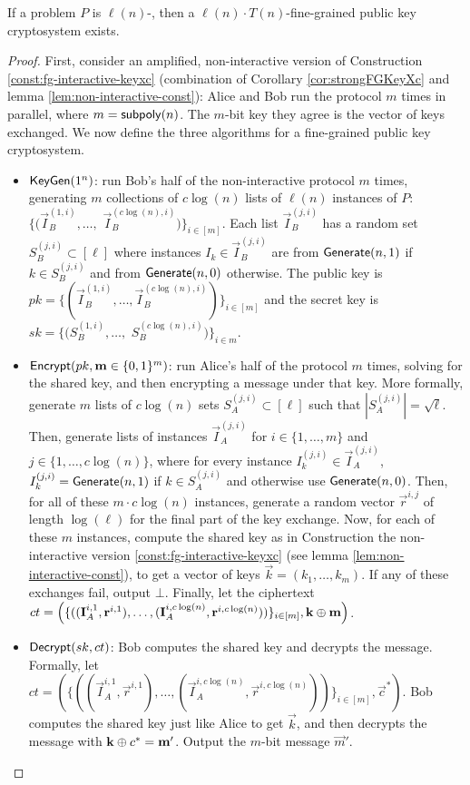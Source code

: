 \begin{theorem}\label{thm:fg-pkc-exists}
	 If a problem $P$ is $\ell(n)$-\keyER, then a $\ell(n) \cdot T(n)$-fine-grained public key cryptosystem exists.
\end{theorem}
\begin{proof}
	First, consider an amplified, non-interactive version of Construction \ref{const:fg-interactive-keyxc} (combination of Corollary \ref{cor:strongFGKeyXc} and lemma \ref{lem:non-interactive-const}): Alice and Bob run the protocol $m$ times in parallel, where $m = \mathsf{subpoly}(n)$.
	The $m$-bit key they agree is the vector of keys exchanged. We now define the three algorithms for a fine-grained public key cryptosystem.
	\begin{itemize}
		\item $\textsf{KeyGen}(1^n)$: run Bob's half of the non-interactive protocol $m$ times, generating $m$ collections of $c\log(n)$ lists of $\ell(n)$ instances of $P$: $\{(\vec I_B^{(1,i)}, \ldots,$ $\vec I_B^{(c\log(n), i)} )\}_{i \in [m]}$. Each list $\vec I_B^{(j,i)}$ has a random set $S_B^{(j,i)} \subset [\ell]$ where instances $I_k \in \vec I_B^{(j,i)}$ are from $\mathsf{Generate}(n,1)$ if $k \in S_B^{(j,i)}$ and from $\mathsf{Generate}(n,0)$ otherwise. The public key is $pk = \{(\vec I_B^{(1,i)}, \ldots, \vec I_B^{(c\log(n), i)} )\}_{i \in [m]}$ and the secret key is $sk = \{(S_B^{(1,i)}, \ldots,$ $S_B^{(c\log(n),i)})\}_{i \in m}$.
		\item $\textsf{Encrypt}(pk, \mathbf m \in \{0,1\}^m)$: run Alice's half of the protocol $m$ times, solving for the shared key, and then encrypting a message under that key. More formally, generate $m$ lists of $c\log(n)$ sets $S_A^{(j,i)} \subset [\ell]$ such that $|S_A^{(j,i)}| = \sqrt{\ell}$. Then, generate lists of instances $\vec I_A^{(j,i)}$ for $i \in \{1,\ldots, m\}$ and $j \in \{1, \ldots, c\log(n)\}$, where for every instance $I_{k}^{(j,i)} \in \vec I_A^{(j,i)}$, $I_{k}^{(j,i)} = \mathsf{Generate}(n,1)$ if $k \in S_A^{(j,i)}$ and otherwise use $\mathsf{Generate}(n,0)$. Then, for all of these $m \cdot c\log(n)$ instances, generate a random vector $\vec r^{i,j}$ of length $\log(\ell)$ for the final part of the key exchange. Now, for each of these $m$ instances, compute the shared key as in Construction the non-interactive version \ref{const:fg-interactive-keyxc} (see lemma \ref{lem:non-interactive-const}), to get a vector of keys $\vec k = (k_1, \ldots, k_m)$. If any of these exchanges fail, output $\bot$.
		Finally, let the ciphertext $ct = \left( \{((\mathbf I_A^{i,1}, \mathbf r^{i, 1}), \ldots, (\mathbf I_A^{i,c\log(n)}, \mathbf r^{i, c \log(n)}))\}_{i \in [m]}, \mathbf k \oplus \mathbf m \right)$.
		\item $\textsf{Decrypt}(sk, ct)$: Bob computes the shared key and decrypts the message. Formally, let $ct = \left(\{((\vec I_A^{i,1}, \vec r^{i, 1}), \ldots, (\vec I_A^{i,c\log(n)}, \vec r^{i, c \log(n)}))\}_{i \in [m]}, \vec c^*  \right)$. Bob computes the shared key just like Alice to get $\vec k$, and then decrypts the message with $\mathbf k \oplus c^* = \mathbf m'$. Output the $m$-bit message $\vec m'$.
	\end{itemize}


\end{proof}
